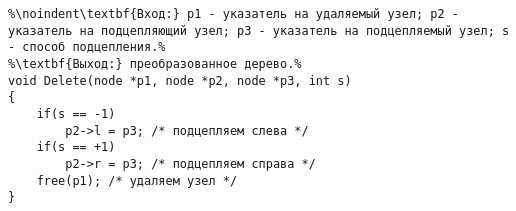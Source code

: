 \documentclass{article}
\begin{document}
\begin{lstlisting}[escapechar=\%]
%2. Удаление узла - процедура Delete.%
%\noindent\textbf{Вход:} p1 - указатель на удаляемый узел; p2 - указатель на подцепляющий узел; p3 - указатель на подцепляемый узел; s - способ подцепления.%
%\textbf{Выход:} преобразованное дерево.%
void Delete(node *p1, node *p2, node *p3, int s)
{
	if(s == -1)
		p2->l = p3; /* подцепляем слева */
	if(s == +1)
		p2->r = p3; /* подцепляем справа */
	free(p1); /* удаляем узел */
}
\end{lstlisting}
\end{document}
